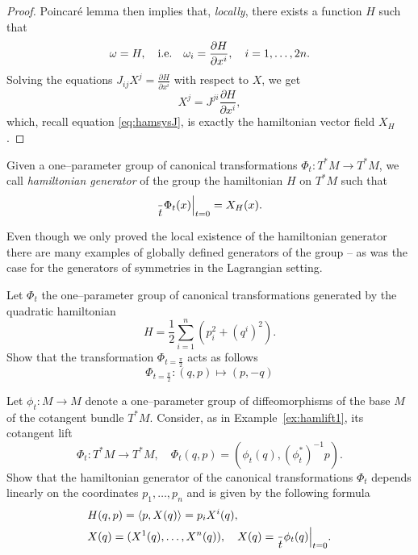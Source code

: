 \documentclass[english,fontsize=11pt,paper=a5,oneside]{scrbook}
\let\d\relax
\newcommand{\d}{\mathrm{d}}
\theoremstyle{definition}
\newenvironment{exercise}
  {\pushQED{\qed}\renewcommand{\qedsymbol}{$\maltese$}\exercisex}
  {\popQED\endexercisex}
\begin{document}
\begin{proof}
  Poincar\'e lemma \cite{book:lee} then implies that, \emph{locally}, there exists a function $H$ such that
  \begin{equation}
    \omega = \d H, \quad\mbox{i.e.}\quad \omega_i = \frac{\partial H}{\partial x^i}, \quad i=1,\ldots,2n.
  \end{equation}
  Solving the equations $J_{ij} X^j = \frac{\partial H}{\partial x^i}$ with respect to $X$, we get
  \begin{equation}\label{eq:hamsysJ-1}
    X^j = J^{ji} \frac{\partial H}{\partial x^i},
  \end{equation}
  which, recall equation \eqref{eq:hamsysJ}, is exactly the hamiltonian vector field $X_H$.
\end{proof}

\begin{tcolorbox}
  Given a one--parameter group of canonical transformations $\Phi_t:T^*M\to T^*M$, we call \emph{hamiltonian generator} of the group the hamiltonian $H$ on $T^*M$ such that
  \begin{equation}
    \frac{\d }{\d t}\Phi_t(x)\Big|_{t=0} = X_H(x).
  \end{equation}
\end{tcolorbox}

Even though we only proved the local existence of the hamiltonian generator there are many examples of globally defined generators of the group -- as was the case for the generators of symmetries in the Lagrangian setting.

\begin{exercise}
  Let $\Phi_t$ the one--parameter group of canonical transformations generated by the quadratic hamiltonian
  \begin{equation}
    H = \frac12 \sum_{i=1}^n\left(p_i^2 + (q^i)^2\right).
  \end{equation}
  Show that the transformation $\Phi_{t=\frac\pi2}$ acts as follows
  \begin{equation}
    \Phi_{t=\frac\pi2} : (q,p) \mapsto (p, -q)
  \end{equation}
\end{exercise}


\begin{exercise}
  Let $\phi_t:M\to M$ denote a one--parameter group of diffeomorphisms of the base  $M$ of the cotangent bundle $T^*M$.
  Consider, as in Example~\ref{ex:hamlift1}, its cotangent lift
  \begin{equation}
    \Phi_t:T^*M\to T^*M, \quad \Phi_t(q,p) = \left(\phi_t(q), \left(\phi_t^*\right)^{-1}p\right).
  \end{equation}
  Show that the hamiltonian generator of the canonical transformations $\Phi_t$ depends linearly on the coordinates $p_1, \ldots, p_n$ and is given by the following formula
  \begin{align}
     & H(q,p) = \langle p, X(q) \rangle = p_i X^i(q), \label{eq:linhamp}                   \\
     & X(q) = (X^1(q), \ldots, X^n(q)), \quad X(q) = \frac{\d}{\d t} \phi_t(q)\Big|_{t=0}.
  \end{align}
\end{exercise}
\end{document}
